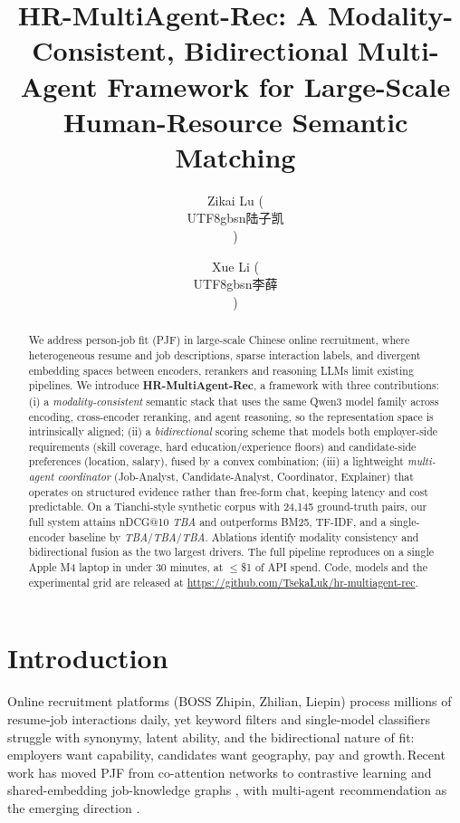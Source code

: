 \documentclass[11pt]{article}
\title{HR-MultiAgent-Rec: A Modality-Consistent, Bidirectional Multi-Agent
Framework for Large-Scale Human-Resource Semantic Matching}
\author[1]{Zikai Lu (\begin{CJK*}{UTF8}{gbsn}陆子凯\end{CJK*})}
\author[1]{Xue Li (\begin{CJK*}{UTF8}{gbsn}李薛\end{CJK*})}
\affil[1]{Jiangsu Ocean University, College of Science}
\begin{document}
\maketitle

\begin{abstract}
\noindent
We address person-job fit (PJF) in large-scale Chinese online recruitment,
where heterogeneous resume and job descriptions, sparse interaction labels,
and divergent embedding spaces between encoders, rerankers and reasoning
LLMs limit existing pipelines. We introduce \textbf{HR-MultiAgent-Rec}, a
framework with three contributions: (i) a \emph{modality-consistent} semantic
stack that uses the same Qwen3 model family across encoding, cross-encoder
reranking, and agent reasoning, so the representation space is intrinsically
aligned; (ii) a \emph{bidirectional} scoring scheme that models both
employer-side requirements (skill coverage, hard education/experience floors)
and candidate-side preferences (location, salary), fused by a convex
combination; (iii) a lightweight \emph{multi-agent coordinator} (Job-Analyst,
Candidate-Analyst, Coordinator, Explainer) that operates on structured
evidence rather than free-form chat, keeping latency and cost predictable.
On a Tianchi-style synthetic corpus with 24{,}145 ground-truth pairs, our
full system attains nDCG@10 \emph{TBA} and outperforms BM25, TF-IDF, and a
single-encoder baseline by \emph{TBA}/\emph{TBA}/\emph{TBA}. Ablations
identify modality consistency and bidirectional fusion as the two largest
drivers. The full pipeline reproduces on a single Apple M4 laptop in under
30 minutes, at $\leq$\$1 of API spend. Code, models and the experimental
grid are released at \url{https://github.com/TsekaLuk/hr-multiagent-rec}.
\end{abstract}

\section{Introduction}
\label{sec:intro}

Online recruitment platforms (BOSS Zhipin, Zhilian, Liepin) process millions
of resume-job interactions daily, yet keyword filters and single-model
classifiers struggle with synonymy, latent ability, and the bidirectional
nature of fit: employers want capability, candidates want geography, pay and
growth.\,Recent work has moved PJF from co-attention networks
\citep{Zhu2018PJFNN,Qin2018APJFNN} to contrastive learning
\citep{Yu2024ConFit} and shared-embedding job-knowledge graphs
\citep{Rosenberger2025CareerBERT}, with multi-agent recommendation as the
emerging direction \citep{Wang2024MACRec,Peng2025AgentSurvey}.
\end{document}
